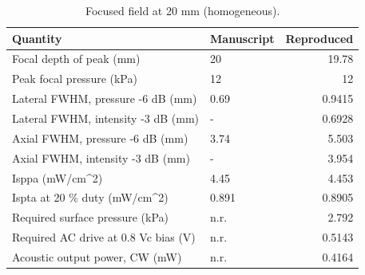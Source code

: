 \begin{table}
\caption{Focused field at 20 mm (homogeneous).}
\label{tab:T_S2_focus}
\begin{tabular}{llr}
\toprule
Quantity & Manuscript & Reproduced \\
\midrule
Focal depth of peak (mm) & 20 & 19.78 \\
Peak focal pressure (kPa) & 12 & 12 \\
Lateral FWHM, pressure -6 dB (mm) & 0.69 & 0.9415 \\
Lateral FWHM, intensity -3 dB (mm) & - & 0.6928 \\
Axial FWHM, pressure -6 dB (mm) & 3.74 & 5.503 \\
Axial FWHM, intensity -3 dB (mm) & - & 3.954 \\
Isppa (mW/cm\textasciicircum 2) & 4.45 & 4.453 \\
Ispta at 20 \% duty (mW/cm\textasciicircum 2) & 0.891 & 0.8905 \\
Required surface pressure (kPa) & n.r. & 2.792 \\
Required AC drive at 0.8 Vc bias (V) & n.r. & 0.5143 \\
Acoustic output power, CW (mW) & n.r. & 0.4164 \\
\bottomrule
\end{tabular}
\end{table}
